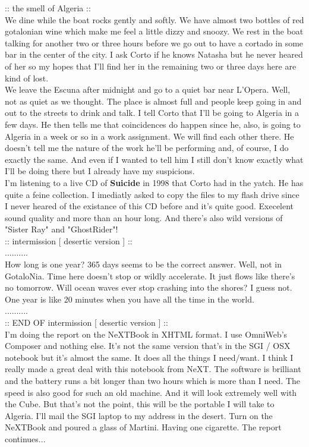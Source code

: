 \documentclass[11pt,twoside,a4paper]{book}
\begin{document}
\begin{multicols*}{2}
\vfill
\columnbreak

    {\small :: the smell of Algeria ::} ~\\
    We dine while the boat rocks gently and softly. We have almost two bottles of red gotalonian wine which make me feel a little dizzy and snoozy. We rest in the boat talking for another two or three hours before we go out to have a cortado in some bar in the center of the city. I ask Corto if he knows Natasha but he never heared of her so my hopes that I'll find her in the remaining two or three days here are kind of lost. ~\\

    We leave the Escuna after midnight and go to a quiet bar near L'Opera. Well, not as quiet as we thought. The place is almost full and people keep going in and out to the streets to drink and talk. I tell Corto that I'll be going to Algeria in a few days. He then tells me that coincidences do happen since he, also, is going to Algeria in a week or so in a work assignment. We will find each other there. He doesn't tell me the nature of the work he'll be performing and, of course, I do exactly the same. And even if I wanted to tell him I still don't know exactly what I'll be doing there but I already have my suspicions. ~\\

    I'm listening to a live CD of \textbf{Suicide} in 1998 that Corto had in the yatch. He has quite a feine collection. I imediatly asked to copy the files to my flash drive since I never heared of the existance of this CD before and it's quite good. Execelent sound quality and more than an hour long. And there's also wild versions of "Sister Ray" and "GhostRider"! ~\\

    {\small :: intermission [ desertic version ] ::} ~\\
	.......... ~\\
        How long is one year? 365 days seems to be the correct answer. Well, not in GotaloNia. Time here doesn't stop or wildly accelerate. It just flows like there's no tomorrow. Will ocean waves ever stop crashing into the shores? I guess not. One year is like 20 minutes when you have all the time in the world. ~\\
	.......... ~\\
    {\small :: END OF intermission [ desertic version ] ::} ~\\

    I'm doing the report on the NeXTBook in XHTML format. I use OmniWeb's Composer and nothing else. It's not the same version that's in the SGI / OSX notebook but it's almost the same. It does all the things I need/want. I think I really made a great deal with this notebook from NeXT. The software is brilliant and the battery runs a bit longer than two hours which is more than I need. The speed is also good for such an old machine. And it will look extremely well with the Cube. But that's not the point, this will be the portable I will take to Algeria. I'll mail the SGI laptop to my address in the desert. Turn on the NeXTBook and poured a glass of Martini. Having one cigarette. The report continues... ~\\


\end{multicols*}
\end{document}
